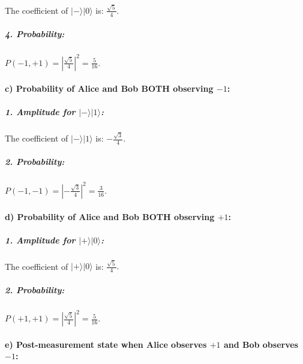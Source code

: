 \documentclass[11pt]{article}
\begin{document}
The coefficient of \(|-\rangle|0\rangle\) is: \(\frac{\sqrt{5}}{4}.\)

\subparagraph{4. Probability:}\label{probability}

\(P(-1, +1) = \left|\frac{\sqrt{5}}{4}\right|^2 = \frac{5}{16}.\)

\paragraph{\texorpdfstring{\textbf{c) Probability of Alice and Bob BOTH
observing
\(-1\):}}{c) Probability of Alice and Bob BOTH observing -1:}}\label{c-probability-of-alice-and-bob-both-observing--1}

\subparagraph{\texorpdfstring{1. Amplitude for
\(|-\rangle|1\rangle\):}{1. Amplitude for \textbar-\textbackslash rangle\textbackslash rangle:}}\label{amplitude-for--rangle1rangle}

The coefficient of \(|-\rangle|1\rangle\) is: \(-\frac{\sqrt{3}}{4}.\)

\subparagraph{2. Probability:}\label{probability-1}

\(P(-1, -1) = \left|-\frac{\sqrt{3}}{4}\right|^2 = \frac{3}{16}.\)

\paragraph{\texorpdfstring{\textbf{d) Probability of Alice and Bob BOTH
observing
\(+1\):}}{d) Probability of Alice and Bob BOTH observing +1:}}\label{d-probability-of-alice-and-bob-both-observing-1}

\subparagraph{\texorpdfstring{1. Amplitude for
\(|+\rangle|0\rangle\):}{1. Amplitude for \textbar+\textbackslash rangle\textbackslash rangle:}}\label{amplitude-for-rangle0rangle}

The coefficient of \(|+\rangle|0\rangle\) is: \(\frac{\sqrt{5}}{4}.\)

\subparagraph{2. Probability:}\label{probability-2}

\(P(+1, +1) = \left|\frac{\sqrt{5}}{4}\right|^2 = \frac{5}{16}.\)

\paragraph{\texorpdfstring{\textbf{e) Post-measurement state when Alice
observes \(+1\) and Bob observes
\(-1\):}}{e) Post-measurement state when Alice observes +1 and Bob observes -1:}}\label{e-post-measurement-state-when-alice-observes-1-and-bob-observes--1}
\end{document}
